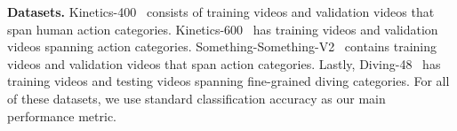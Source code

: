 \documentclass{article}
\begin{document}
\textbf{Datasets.} Kinetics-400~\cite{DBLP:conf/cvpr/CarreiraZ17} consists of  training
videos and  validation videos that span  human action categories. Kinetics-600~\cite{DBLP:journals/corr/abs-1808-01340} has   training videos and  validation videos spanning  action categories. Something-Something-V2~\cite{DBLP:journals/corr/GoyalKMMWKHFYMH17} contains  training videos and  validation videos that span  action categories. Lastly, Diving-48~\cite{Li_2018_ECCV} has  training videos and  testing videos spanning  fine-grained diving categories. For all of these datasets, we use standard classification accuracy as our main performance metric.






\end{document}
